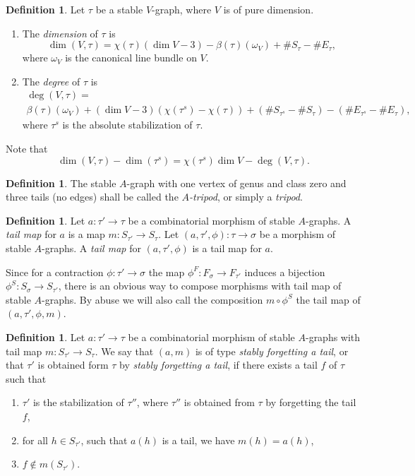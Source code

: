 \documentclass[11pt]{amsart}
\theoremstyle{definition}
\newtheorem{defn}[prop]{Definition}
\theoremstyle{remark}
\newcommand{\comp}{\mathbin{{\scriptstyle\circ}}}
\renewcommand{\t}{_{\tau}}
\newcommand{\s}{_{\sigma}}
\theoremstyle{plain}
\theoremstyle{definition}
\theoremstyle{remark}
\begin{document}
\begin{defn}
Let \(\tau\) be a stable \(V\)-graph, where \(V\) is of pure dimension.
\begin{enumerate}
\item The {\em dimension } of \(\tau\) is
\[
\dim(V,\tau)=\chi(\tau)(\dim V-3)-\beta(\tau)(\omega_V)+\# S\t-\# E\t,
\]
where \(\omega_V\) is the canonical line bundle on \(V\).
\item The {\em degree } of \(\tau\) is
\begin{multline*}
\deg(V,\tau)=\\
\beta(\tau)(\omega_V)+(\dim V-3)(\chi(\tau^s)-\chi(\tau))+(\# S_{\tau^s}-\#
S\t)-(\# E_{\tau^s}-\# E\t),
\end{multline*}
where \(\tau^s\) is the absolute stabilization of \(\tau\).
\end{enumerate}
\end{defn}

Note that
\[
\dim(V,\tau)-\dim(\tau^s)=\chi(\tau^s)\dim V-\deg(V,\tau).
\]

\begin{defn}
The stable \(A\)-graph with one vertex of genus and class zero and three tails
(no edges) shall be called the
{\em \(A\)-tripod}, or simply a {\em tripod}.
\end{defn}

\begin{defn}
Let \(a:\tau'\rightarrow\tau\) be a combinatorial morphism of stable \(A\)-graphs.
A {\em tail map } for \(a\) is a map
\(m:S_{\tau'}\rightarrow S\t\). Let \((a,\tau',\phi):\tau\rightarrow\sigma\) be a
morphism of stable \(A\)-graphs. A {\em tail
map } for \((a,\tau',\phi)\) is a tail map for \(a\).
\end{defn}

Since for a contraction \(\phi:\tau'\rightarrow\sigma\) the map
\(\phi^F:F\s\rightarrow F_{\tau'}\) induces a bijection
\(\phi^S:S\s\rightarrow S_{\tau'}\), there is an obvious way to compose morphisms
with tail map of stable \(A\)-graphs. By
abuse we will also call the composition \(m\comp\phi^S\) the tail map of
\((a,\tau',\phi,m)\).

\begin{defn} \label{dsft}
Let \(a:\tau'\rightarrow \tau\) be a combinatorial morphism of stable \(A\)-graphs
with tail map \(m:S_{\tau'}\rightarrow
S\t\). We say that \((a,m)\) is of type {\em stably forgetting a tail}, or that
\(\tau'\) is obtained form \(\tau\) by {\em
stably forgetting a tail}, if there exists a tail \(f\) of \(\tau\) such that
\begin{enumerate}
\item \(\tau'\) is the stabilization of \(\tau''\), where \(\tau''\) is obtained from
\(\tau\) by forgetting the tail \(f\),
\item for all \(h\in S_{\tau'}\), such that \(a(h)\) is a tail, we have
\(m(h)=a(h)\),
\item \(f\not\in m(S_{\tau'})\).
\end{enumerate}
\end{defn}
\end{document}

